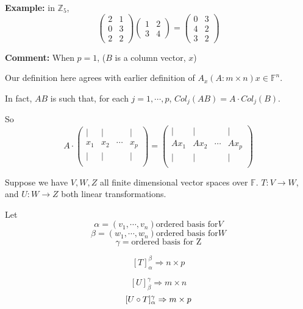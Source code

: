 \documentclass[12pt]{article}
\theoremstyle{plain}
\newcommand{\mZ}{{\mathbb{Z}}}
\newcommand{\mF}{{\mathbb{F}}}
\begin{document}
	{\color{Brown}
	\textbf{Example: } in $\mZ_5$, 
	\[
		\begin{pmatrix}
			2 & 1 \\
			0 & 3 \\
			2 & 2 
		\end{pmatrix}
		\begin{pmatrix}
			1 & 2 \\
			3 & 4
		\end{pmatrix}
		= 
		\begin{pmatrix}
			0 & 3 \\
			4 & 2 \\
			3 & 2
		\end{pmatrix}
	\]
	}

	\textbf{Comment: } When $p = 1$, ($B$ is a column vector, $x$)
	
	Our definition here agrees with earlier definition of $A_x (A : m\times n)
	x \in \mF^n$. 

	In fact, $AB$ is such that, for each $j = 1,\cdots, p$, 
	$Col_j(AB) = A\cdot Col_j(B)$. 
	
	So 
	\[
		A \cdot 
		\begin{pmatrix}
			| & | &  & |\\
			x_1 & x_2 & \cdots & x_p\\
			| & | &  & |\\
		\end{pmatrix}
		= \begin{pmatrix}
			| & | &  & |\\
			Ax_1 & Ax_2 & \cdots & Ax_p\\
			| & | &  & |\\
		\end{pmatrix}
	\]

	Suppose we have $V, W, Z$ all finite dimensional vector spaces over $\mF$. 
	$T:V\to W$, and $U:W\to Z$ both linear transformations. 

	Let 
	\[
		\alpha = (v_1,\cdots, v_n) \text{ordered basis for} V
	\]
	\[
		\beta = (w_1,\cdots, w_n) \text{ordered basis for}  W
	\]
	\[
		\gamma = \text{ordered basis for Z}
	\]

	\[
		[T]_{\alpha}^{\beta} \Rightarrow n \times p
	\]

	\[
		[U]_{\beta}^{\gamma} \Rightarrow m \times n
	\]
	\[
		[U\circ T]_{\alpha}^{\gamma} \Rightarrow m \times p\\
	\]
	
\end{document}
